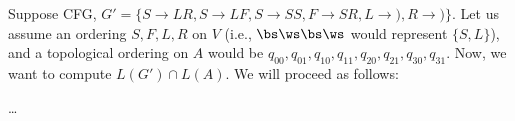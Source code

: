 \noindent Suppose CFG, $G'= \{S \rightarrow L R, S \rightarrow L F, S \rightarrow S S, F \rightarrow S R, L \rightarrow ), R \rightarrow )\}$.
Let us assume an ordering $S, F, L, R$ on $V$ (i.e., $\bs\ws\bs\ws$ would represent $\{S, L\}$), and a topological ordering on $A$ would be $q_{00}, q_{01}, q_{10}, q_{11}, q_{20}, q_{21}, q_{30}, q_{31}$. Now, we want to compute $L(G')\cap L(A)$. We will proceed as follows:


\ldots

